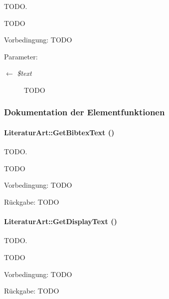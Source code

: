 TODO. 

TODO \begin{Desc}
\item[Vorbedingung:]TODO \end{Desc}
\begin{Desc}
\item[Parameter:]
\begin{description}
\item[\mbox{$\leftarrow$} {\em \$text}]TODO \end{description}
\end{Desc}


\subsubsection{Dokumentation der Elementfunktionen}
\hypertarget{classLiteraturArt_01e1a2acd95df1ae0bb22e57b70a63de}{
\paragraph[GetBibtexText]{\setlength{\rightskip}{0pt plus 5cm}Literatur\-Art::Get\-Bibtex\-Text ()}\hfill}
\label{classLiteraturArt_01e1a2acd95df1ae0bb22e57b70a63de}


TODO. 

TODO \begin{Desc}
\item[Vorbedingung:]TODO \end{Desc}
\begin{Desc}
\item[R\"{u}ckgabe:]TODO \end{Desc}
\hypertarget{classLiteraturArt_43f747a6c5d840a22ddcd7e46d27cba0}{
\paragraph[GetDisplayText]{\setlength{\rightskip}{0pt plus 5cm}Literatur\-Art::Get\-Display\-Text ()}\hfill}
\label{classLiteraturArt_43f747a6c5d840a22ddcd7e46d27cba0}


TODO. 

TODO \begin{Desc}
\item[Vorbedingung:]TODO \end{Desc}
\begin{Desc}
\item[R\"{u}ckgabe:]TODO \end{Desc}
